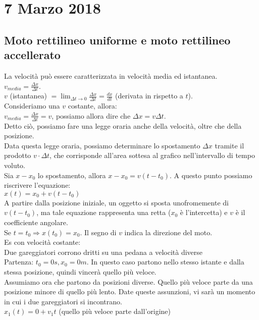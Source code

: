 \documentclass{article}
\begin{document}
\section*{7 Marzo 2018}
\subsection*{Moto rettilineo uniforme e moto rettilineo accellerato}
La velocit\`{a} pu\`{o} essere caratterizzata in velocit\`{a} media ed istantanea.\\
$v_{media}=\frac{\Delta x}{\Delta t}$.\\
$v$ (istantanea) $=\lim_{\Delta t\to 0}\frac{\Delta x}{\Delta t}=\frac{dx}{dt}$ (derivata in rispetto a $t$).\\
Consideriamo una $v$ costante, allora:\\
$v_{media}=\frac{\Delta x}{\Delta t} = v$, possiamo allora dire che $\Delta x = v\Delta t$.\\
Detto ci\`{o}, possiamo fare una legge oraria anche della velocit\`{a}, oltre che della posizione.\\
Data questa legge oraria, possiamo determinare lo spostamento $\Delta x$ tramite il prodotto $v\cdot \Delta t$, che corrisponde
all'area sottesa al grafico nell'intervallo di tempo voluto.\\
Sia $x-x_0$ lo spostamento, allora $x-x_0=v(t-t_0)$. A questo punto possiamo riscrivere
l'equazione:\\
$x(t)=x_0+v(t-t_0)$\\
A partire dalla posizione iniziale, un oggetto si sposta unofromemente di $v(t-t_0)$,
ma tale equazione rappresenta una retta ($x_0$ \`{e} l'intercetta)
e $v$ \`{e} il coefficiente angolare.\\
Se $t=t_0\Rightarrow x(t_0)=x_0$. Il segno di $v$ indica la direzione del moto.\\
Es con velocit\`{a} costante:\\
Due gareggiatori corrono dritti su una pedana a velocit\`{a} diverse\\
Partenza: $t_0= 0 s, x_0= 0 m$. In questo caso partono nello stesso istante e 
dalla stessa posizione, quindi vincer\`{a} quello pi\`{u} veloce.\\
Assumiamo ora che partono da posizioni diverse. Quello pi\`{u} veloce parte da 
una posizione minore di quello pi\`{u} lento. Date queste assunzioni, vi sar\`{a}
un momento in cui i due gareggiatori si incontrano.\\
$x_1(t)=0+v_1 t$ (quello pi\`{u} veloce parte dall'origine)\\
\end{document}
